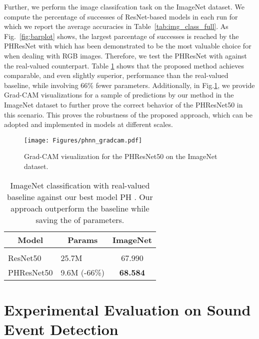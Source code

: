 \documentclass[lettersize,journal]{IEEEtran}
\begin{document}
Further, we perform the image classifcation task on the ImageNet dataset. We compute the percentage of successes of ResNet-based models in each run for which we report the average accuracies in Table~\ref{tab:img_class_full}. As Fig.~\ref{fig:barplot} shows, the largest parcentage of successes is reached by the PHResNet with  which has been demonstrated to be the most valuable choice for  when dealing with RGB images. Therefore, we test the PHResNet with  against the real-valued counterpart. Table \ref{tab:img_img} shows that the proposed method achieves comparable, and even slightly superior, performance than the real-valued baseline, while involving 66\% fewer parameters. Additionally, in Fig.\ref{fig:gradcam}, we provide Grad-CAM visualizations \cite{GradCAM2017ICCV} for a sample of predictions by our method in the ImageNet dataset to further prove the correct behavior of the PHResNet50  in this scenario. This proves the robustness of the proposed approach, which can be adopted and implemented in models at different scales.

\begin{figure}
    \centering
    \texttt{[image: Figures/phnn\_gradcam.pdf]}
    \caption{Grad-CAM visualization for the PHResNet50  on the ImageNet dataset.}
    \label{fig:gradcam}
\end{figure}
\begin{table}[t]
\caption{ImageNet classification with real-valued baseline against our best model PH . Our approach outperform the baseline while saving the  of parameters.}
\label{tab:img_img}
\begin{center}
\begin{tabular}{llc}
\multicolumn{1}{c}{\bf Model} & \multicolumn{1}{c}{\bf Params} & \multicolumn{1}{c}{\bf ImageNet}\\
\hline \\
ResNet50         & 25.7M & 67.990 \\ PHResNet50  & 9.6M (-66\%) & \textbf{68.584} \\
\end{tabular}
\end{center}
\end{table}



\section{Experimental Evaluation on Sound Event Detection}
\label{sec:sed}
\end{document}
